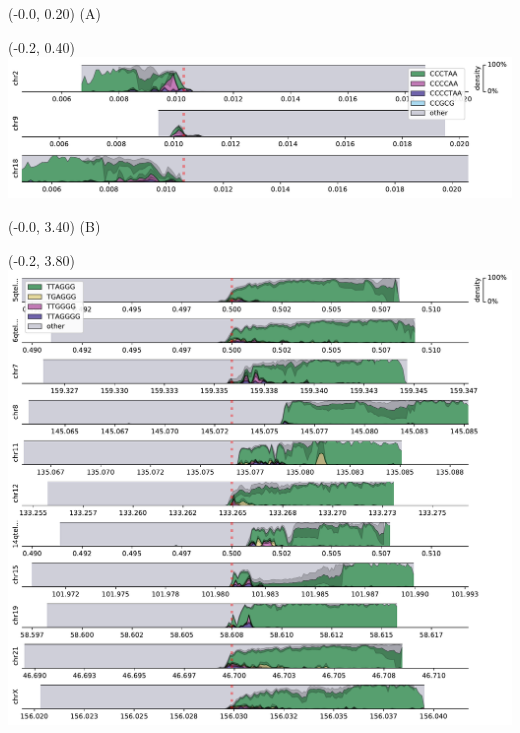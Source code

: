\documentclass{article}
\begin{document}
\begin{textblock}{13}(-0.0,  0.20) \LARGE{(A)} \end{textblock}
\begin{textblock}{13}(-0.2,  0.40) \includegraphics{assets/HG001-densityplot-p_arm.pdf}   \end{textblock}

\begin{textblock}{13}(-0.0,  3.40) \LARGE{(B)} \end{textblock}
\begin{textblock}{13}(-0.2,  3.80) \includegraphics{assets/HG001-densityplot-q_arm.pdf}   \end{textblock}
\end{document}
